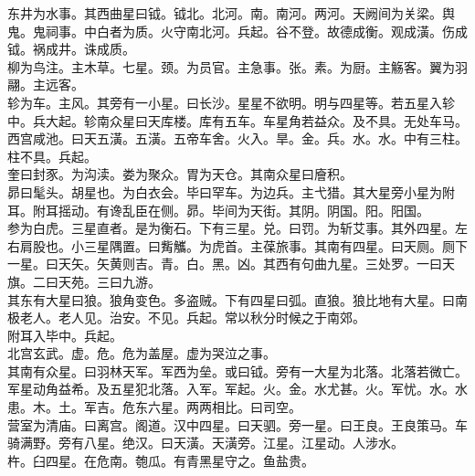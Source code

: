 \documentclass{zhvt-classic}
\begin{document}
\hspace*{2em}东井为水事。其西曲星曰钺。钺北。北河。南。南河。两河。天阙间为关梁。舆鬼。鬼祠事。中白者为质。火守南北河。兵起。谷不登。故德成衡。观成潢。伤成钺。祸成井。诛成质。\\
\hspace*{2em}柳为鸟注。主木草。七星。颈。为员官。主急事。张。素。为厨。主觞客。翼为羽翮。主远客。\\
\hspace*{2em}轸为车。主风。其旁有一小星。曰长沙。星星不欲明。明与四星等。若五星入轸中。兵大起。轸南众星曰天库楼。库有五车。车星角若益众。及不具。无处车马。\\
\hspace*{2em}西宫咸池。曰天五潢。五潢。五帝车舍。火入。旱。金。兵。水。水。中有三柱。柱不具。兵起。\\
\hspace*{2em}奎曰封豕。为沟渎。娄为聚众。胃为天仓。其南众星曰廥积。\\
\hspace*{2em}昴曰髦头。胡星也。为白衣会。毕曰罕车。为边兵。主弋猎。其大星旁小星为附耳。附耳摇动。有谗乱臣在侧。昴。毕间为天街。其阴。阴国。阳。阳国。\\
\hspace*{2em}参为白虎。三星直者。是为衡石。下有三星。兑。曰罚。为斩艾事。其外四星。左右肩股也。小三星隅置。曰觜觿。为虎首。主葆旅事。其南有四星。曰天厕。厕下一星。曰天矢。矢黄则吉。青。白。黑。凶。其西有句曲九星。三处罗。一曰天旗。二曰天苑。三曰九游。\\
\hspace*{2em}其东有大星曰狼。狼角变色。多盗贼。下有四星曰弧。直狼。狼比地有大星。曰南极老人。老人见。治安。不见。兵起。常以秋分时候之于南郊。\\
\hspace*{2em}附耳入毕中。兵起。\\
\hspace*{2em}北宫玄武。虚。危。危为盖屋。虚为哭泣之事。\\
\hspace*{2em}其南有众星。曰羽林天军。军西为垒。或曰钺。旁有一大星为北落。北落若微亡。军星动角益希。及五星犯北落。入军。军起。火。金。水尤甚。火。军忧。水。水患。木。土。军吉。危东六星。两两相比。曰司空。\\
\hspace*{2em}营室为清庙。曰离宫。阁道。汉中四星。曰天驷。旁一星。曰王良。王良策马。车骑满野。旁有八星。绝汉。曰天潢。天潢旁。江星。江星动。人涉水。\\
\hspace*{2em}杵。臼四星。在危南。匏瓜。有青黑星守之。鱼盐贵。\\
\end{document}
